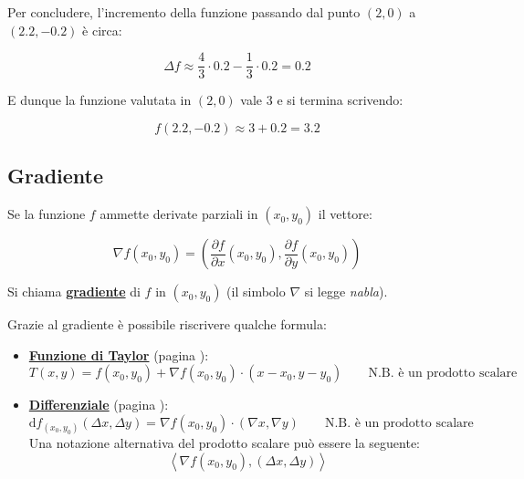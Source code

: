 \documentclass[a4paper]{article}
\begin{document}
	\noindent
	Per concludere, l'incremento della funzione passando dal punto $\left(2,0\right)$ a $\left(2.2,-0.2\right)$ è circa:
	
	\begin{equation*}
		\Delta f \approx \dfrac{4}{3} \cdot 0.2 - \dfrac{1}{3} \cdot 0.2 = 0.2
	\end{equation*}

	\noindent
	E dunque la funzione valutata in $\left(2,0\right)$ vale $3$ e si termina scrivendo:
	
	\begin{equation*}
		f\left(2.2,-0.2\right) \approx 3 + 0.2 = 3.2
	\end{equation*}

	\newpage
	
	\subsection{Gradiente}
	
	Se la funzione $f$ ammette derivate parziali in $\left(x_{0},y_{0}\right)$ il vettore:
	
	\begin{equation*}
		\nabla f\left(x_{0},y_{0}\right) = \left(\dfrac{\partial f}{\partial x}\left(x_{0},y_{0}\right), \dfrac{\partial f}{\partial y}\left(x_{0},y_{0}\right)\right)
	\end{equation*}

	\noindent
	Si chiama \textcolor{Red3}{\textbf{\underline{gradiente}}} di $f$ in $\left(x_{0},y_{0}\right)$ (il simbolo $\nabla$ si legge \emph{nabla}).\newline
	
	\noindent
	Grazie al gradiente è possibile riscrivere qualche formula:
	
	\begin{itemize}
		\item \textcolor{Red3}{\textbf{\underline{Funzione di Taylor}}} (pagina \pageref{funzione di Taylor}):
		\begin{equation*}
			T\left(x,y\right) = f\left(x_{0},y_{0}\right) + \nabla f\left(x_{0},y_{0}\right) \cdot \left(x-x_{0},y-y_{0}\right) \hspace{2em} \text{N.B. è un prodotto scalare}
		\end{equation*}
	
		\item \textcolor{Red3}{\textbf{\underline{Differenziale}}} (pagina \pageref{differenziabilità}):
		\begin{equation*}
			\mathrm{d}f_{\left(x_{0},y_{0}\right)}\left(\Delta x, \Delta y\right) = \nabla f\left(x_{0},y_{0}\right) \cdot \left(\nabla x, \nabla y\right) \hspace{2em} \text{N.B. è un prodotto scalare}
		\end{equation*}
		Una notazione alternativa del prodotto scalare può essere la seguente:
		\begin{equation*}
			\left\langle \nabla f\left(x_{0}, y_{0}\right), \left(\Delta x, \Delta y\right) \right\rangle
		\end{equation*}
	\end{itemize}
\end{document}

